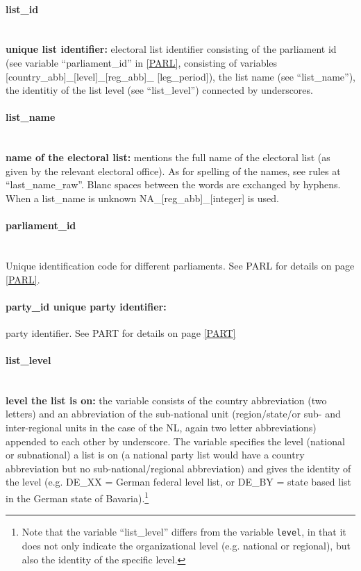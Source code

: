 \documentclass{article}
\begin{document}
\paragraph{list\_id}\\
 \textbf{unique list identifier:} electoral list identifier consisting of the parliament id (see variable ``parliament\_id'' in \ref{PARL}, consisting of variables  [country\_abb]\_[level]\_[reg\_abb]\_ [leg\_period]), the list name (see ``list\_name''), the identitiy of the list level (see ``list\_level'') connected by underscores.
 
\paragraph{list\_name}\\
       \textbf{name of the electoral list:} mentions the full name of the electoral list (as given by the relevant electoral office). As for spelling of the names, see rules at ``last\_name\_raw''. Blanc spaces between the words are exchanged by hyphens. When a list\_name is unknown NA\_[reg\_abb]\_[integer] is used. 
       
\paragraph{parliament\_id}\\
    Unique identification code for different parliaments. See PARL for details on page \ref{PARL}.
       
 \paragraph{party\_id unique party identifier:} party identifier. See PART for details on page \ref{PART}
       
\paragraph{list\_level}\\
      \textbf{level the list is on:} the variable consists of the country abbreviation (two letters) and an abbreviation of the sub-national unit (region/state/or sub- and inter-regional units in the case of the NL, again two letter abbreviations) appended to each other by underscore. The variable specifies the level (national or subnational) a list is on (a national party list would have a country abbreviation but no sub-national/regional abbreviation) and gives the identity of  the  level  (e.g. DE\_XX =  German federal level list, or DE\_BY = state based list in the German state of Bavaria).\footnote{Note that the variable ``list\_level'' differs from the variable \texttt{level}, in that it does not only indicate the organizational level (e.g. national or regional), but also the identity of the specific level.} 
\end{document}
